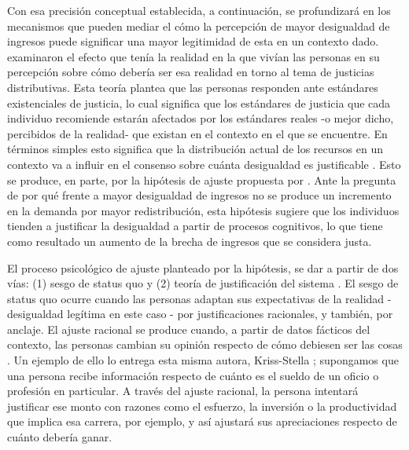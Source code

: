 \documentclass[12pt]{article}
\begin{document}
Con esa precisión conceptual establecida, a continuación, se profundizará en los mecanismos que pueden mediar el cómo la percepción de mayor desigualdad de ingresos puede significar una mayor legitimidad de esta en un contexto dado. \cite{Shepelak1986} examinaron el efecto que tenía la realidad en la que vivían las personas en su percepción sobre cómo debería ser esa realidad en torno al tema de justicias distributivas. Esta teoría plantea que las personas responden ante estándares existenciales de justicia, lo cual significa que los estándares de justicia que cada individuo recomiende estarán afectados por los estándares reales -o mejor dicho, percibidos de la realidad- que existan en el contexto en el que se encuentre. En términos simples esto significa que la distribución actual de los recursos en un contexto va a influir en el consenso sobre cuánta desigualdad es justificable \citep{Castilloetal2019}. Esto se produce, en parte, por la hipótesis de ajuste propuesta por \cite{Trump2017} . Ante la pregunta de por qué frente a mayor desigualdad de ingresos no se produce un incremento en la demanda por mayor redistribución, esta hipótesis sugiere que los individuos tienden a justificar la desigualdad a partir de procesos cognitivos, lo que tiene como resultado un aumento de la brecha de ingresos que se considera justa. 

El proceso psicológico de ajuste planteado por la hipótesis, se dar a partir de dos vías: (1) sesgo de status quo y (2) teoría de justificación del sistema \citep{Trump2017}. El sesgo de status quo ocurre cuando las personas adaptan sus expectativas de la realidad - desigualdad legítima en este caso - por justificaciones racionales, y también, por anclaje. El ajuste racional se produce cuando, a partir de datos fácticos del contexto, las personas cambian su opinión respecto de cómo debiesen ser las cosas \citep{Trump2017}. Un ejemplo de ello lo entrega esta misma autora, Kriss-Stella \cite{Trump2017}; supongamos que una persona recibe información respecto de cuánto es el sueldo de un oficio o profesión en particular. A través del ajuste racional, la persona intentará justificar ese monto con razones como el esfuerzo, la inversión o la productividad que implica esa carrera, por ejemplo, y así ajustará sus apreciaciones respecto de cuánto debería ganar.
\end{document}
